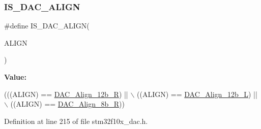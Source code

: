 \subsubsection{\texorpdfstring{I\+S\+\_\+\+D\+A\+C\+\_\+\+A\+L\+I\+GN}{IS\_DAC\_ALIGN}}
{\footnotesize\ttfamily \#define I\+S\+\_\+\+D\+A\+C\+\_\+\+A\+L\+I\+GN(\begin{DoxyParamCaption}\item[{}]{A\+L\+I\+GN }\end{DoxyParamCaption})}

{\bfseries Value\+:}
\begin{DoxyCode}
(((ALIGN) == \hyperlink{group___d_a_c__data__alignment_ga0f2a6fc71aaf90a27b0caf1bd06e73f2}{DAC\_Align\_12b\_R}) || \(\backslash\)
                             ((ALIGN) == \hyperlink{group___d_a_c__data__alignment_gaf3a46d37092eac0d4c9c1039e68208d4}{DAC\_Align\_12b\_L}) || \(\backslash\)
                             ((ALIGN) == \hyperlink{group___d_a_c__data__alignment_gaa633fbcf85e97e12c4894eaed530dd8f}{DAC\_Align\_8b\_R}))
\end{DoxyCode}


Definition at line 215 of file stm32f10x\+\_\+dac.\+h.

